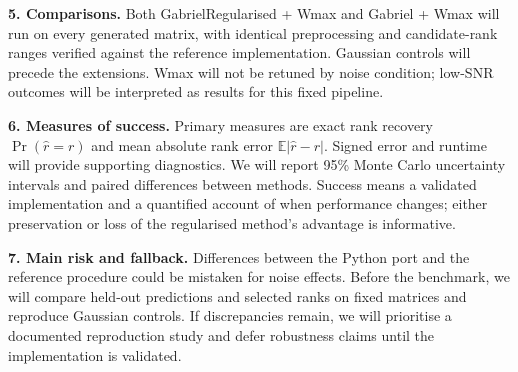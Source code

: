 \documentclass[10pt,a4paper]{article}
\newcommand{\topic}[1]{\par\textbf{#1}\enspace}
\begin{document}
\topic{5. Comparisons.}
Both GabrielRegularised + Wmax and Gabriel + Wmax will run on every generated matrix, with identical preprocessing and candidate-rank ranges verified against the reference implementation. Gaussian controls will precede the extensions. Wmax will not be retuned by noise condition; low-SNR outcomes will be interpreted as results for this fixed pipeline.

\topic{6. Measures of success.}
Primary measures are exact rank recovery $\Pr(\hat r=r)$ and mean absolute rank error $\mathbb{E}|\hat r-r|$. Signed error and runtime will provide supporting diagnostics. We will report 95\% Monte Carlo uncertainty intervals and paired differences between methods. Success means a validated implementation and a quantified account of when performance changes; either preservation or loss of the regularised method's advantage is informative.

\topic{7. Main risk and fallback.}
Differences between the Python port and the reference procedure could be mistaken for noise effects. Before the benchmark, we will compare held-out predictions and selected ranks on fixed matrices and reproduce Gaussian controls. If discrepancies remain, we will prioritise a documented reproduction study and defer robustness claims until the implementation is validated.

\vspace{-4pt}
\begingroup
\footnotesize
\setlength{\bibsep}{1pt}


\endgroup
\end{document}

